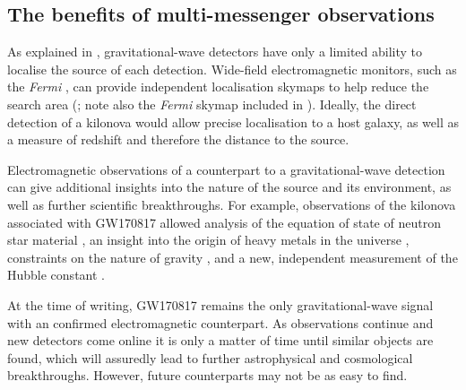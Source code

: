 \subsection{The benefits of multi-messenger observations}
\label{sec:mma_benefits}
\begin{colsection}

As explained in , gravitational-wave detectors have only a limited ability to localise the source of each detection. Wide-field electromagnetic monitors, such as the \textit{Fermi} , can provide independent localisation skymaps to help reduce the search area (\cite{GW170817_GRB}; note also the \textit{Fermi} skymap included in ). Ideally, the direct detection of a kilonova would allow precise localisation to a host galaxy, as well as a measure of redshift and therefore the distance to the source.

Electromagnetic observations of a counterpart to a gravitational-wave detection can give additional insights into the nature of the source and its environment, as well as further scientific breakthroughs. For example, observations of the kilonova associated with GW170817 \citep{GW170817, GW170817_followup} allowed analysis of the equation of state of neutron star material \citep{GW170817_NSscience}, an insight into the origin of heavy metals in the universe \citep{GW170818_heavy}, constraints on the nature of gravity \citep{GW170817_gravity}, and a new, independent measurement of the Hubble constant \citep{GW170817_hubble}.

At the time of writing, GW170817 remains the only gravitational-wave signal with an confirmed electromagnetic counterpart. As observations continue and new detectors come online it is only a matter of time until similar objects are found, which will assuredly lead to further astrophysical and cosmological breakthroughs. However, future counterparts may not be as easy to find.

\end{colsection}


